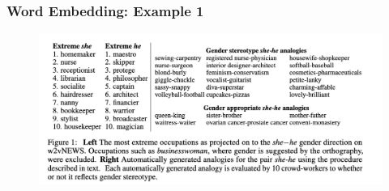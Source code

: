\documentclass[
  shownotes,
  xcolor={svgnames},
  hyperref={colorlinks,citecolor=DarkBlue,linkcolor=DarkRed,urlcolor=DarkBlue}
  , aspectratio=169]{beamer}
\begin{document}
\begin{frame}
\frametitle{Word Embedding: Example 1 }


  \begin{figure}[H] \centering
            \captionsetup{justification=centering}
              \includegraphics[scale=0.5]{figures/bolukbasi_2}
              
 \end{figure}

\end{frame}
\end{document}
